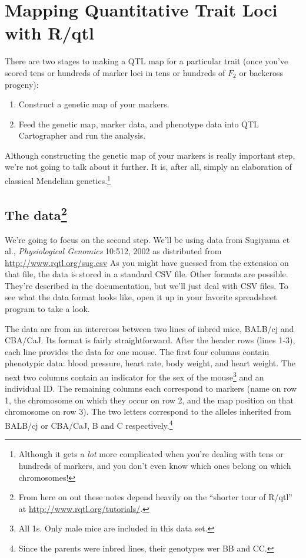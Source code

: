\chapter{Mapping Quantitative Trait Loci with R/qtl}

There are two stages to making a QTL map for a particular trait
(once you've scored tens or hundreds of marker loci in tens or
hundreds of $F_2$ or backcross progeny):

\begin{enumerate}

\item Construct a genetic map of your markers.

\item Feed the genetic map, marker data, and phenotype data into QTL
Cartographer and run the analysis.

\end{enumerate}

\noindent Although constructing the genetic map of your markers is
really important step, we're not going to talk about it further. It
is, after all, simply an elaboration of classical Mendelian
genetics.\footnote{Although it gets a {\it lot\/} more complicated
  when you're dealing with tens or hundreds of markers, and you don't
  even know which ones belong on which chromosomes!} 

\section*{The data\footnote{From here on out these notes depend
  heavily on the ``shorter tour of R/qtl'' at
  \url{http://www.rqtl.org/tutorials/}.}}

We're going to focus on the second step. We'll be using data from
Sugiyama et al., {\it Physiological Genomics\/} 10:512, 2002 as
distributed from \url{http://www.rqtl.org/sug.csv} As you might have
guessed from the extension on that file, the data is stored in a
standard CSV file. Other formats are possible. They're described in
the documentation, but we'll just deal with CSV files. To see what the
data format looks like, open it up in your favorite spreadsheet
program to take a look.

The data are from an intercross between two lines of inbred mice,
BALB/cj and CBA/CaJ. Its format is fairly straightforward. After the
header rows (lines 1-3), each line provides the data for one
mouse. The first four columns contain phenotypic data: blood pressure,
heart rate, body weight, and heart weight. The next two columns
contain an indicator for the sex of the mouse\footnote{All 1s. Only
  male mice are included in this data set.} and an individual ID. The
remaining columns each correspond to markers (name on row 1, the
chromosome on which they occur on row 2, and the map position on that
chromosome on row 3). The two letters correspond to the alleles
inherited from BALB/cj or CBA/CaJ, B and C
respectively.\footnote{Since the parents were inbred lines, their
  genotypes wer BB and CC.}

